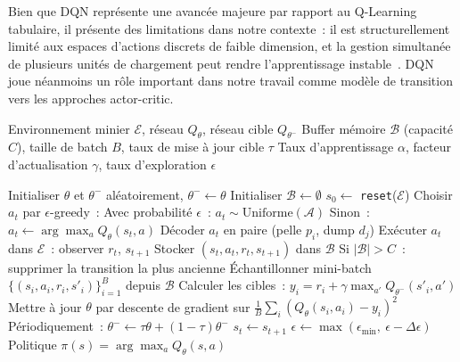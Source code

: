 \documentclass[11pt,a4paper]{report}
\begin{document}
Bien que DQN représente une avancée majeure par rapport au Q-Learning tabulaire, il présente des limitations dans notre contexte~: il est structurellement limité aux espaces d'actions discrets de faible dimension, et la gestion simultanée de plusieurs unités de chargement peut rendre l'apprentissage instable~\cite{MoezKrichen2022}. DQN joue néanmoins un rôle important dans notre travail comme modèle de transition vers les approches actor-critic.

\begin{algorithm}[H]
\caption{DQN pour le dispatching minier}
\label{alg:dqn}
\begin{algorithmic}[1]

\REQUIRE Environnement minier $\mathcal{E}$, réseau $Q_\theta$, réseau cible $Q_{\theta^-}$
\REQUIRE Buffer mémoire $\mathcal{B}$ (capacité $C$), taille de batch $B$, taux de mise à jour cible $\tau$
\REQUIRE Taux d'apprentissage $\alpha$, facteur d'actualisation $\gamma$, taux d'exploration $\epsilon$

\STATE Initialiser $\theta$ et $\theta^-$ aléatoirement, $\theta^- \leftarrow \theta$
\STATE Initialiser $\mathcal{B} \leftarrow \emptyset$
    \STATE $s_0 \leftarrow$ \texttt{reset}($\mathcal{E}$) 
        \STATE Choisir $a_t$ par $\epsilon$-greedy~:
        \STATE \hspace{1em} Avec probabilité $\epsilon$~: $a_t \sim \text{Uniforme}(\mathcal{A})$
        \STATE \hspace{1em} Sinon~: $a_t \leftarrow \arg\max_a Q_\theta(s_t, a)$
        \STATE Décoder $a_t$ en paire (pelle $p_i$, dump $d_j$)
        \STATE Exécuter $a_t$ dans $\mathcal{E}$~: observer $r_t$, $s_{t+1}$
        \STATE Stocker $(s_t, a_t, r_t, s_{t+1})$ dans $\mathcal{B}$
        \STATE Si $|\mathcal{B}| > C$~: supprimer la transition la plus ancienne
        \STATE Échantillonner mini-batch $\{(s_i, a_i, r_i, s'_i)\}_{i=1}^B$ depuis $\mathcal{B}$
        \STATE Calculer les cibles~: $y_i = r_i + \gamma \max_{a'} Q_{\theta^-}(s'_i, a')$
        \STATE Mettre à jour $\theta$ par descente de gradient sur $\frac{1}{B} \sum_i (Q_\theta(s_i, a_i) - y_i)^2$
        \STATE Périodiquement~: $\theta^- \leftarrow \tau \theta + (1-\tau) \theta^-$
        \STATE $s_t \leftarrow s_{t+1}$
    \ENDWHILE
    \STATE $\epsilon \leftarrow \max(\epsilon_{\min},\ \epsilon - \Delta\epsilon)$
\ENDFOR
\RETURN Politique $\pi(s) = \arg\max_a Q_\theta(s, a)$

\end{algorithmic}
\end{algorithm}
\end{document}
